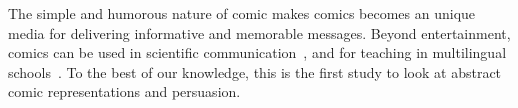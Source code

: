 The simple and humorous nature of comic makes comics becomes an unique media for delivering informative and memorable messages. Beyond entertainment, comics can be used in scientific communication~\textcite{McDermottPB18}, and for teaching in multilingual schools~\textcite{cary2004going}. To the best of our knowledge, this is the first study to look at abstract comic representations and persuasion.



